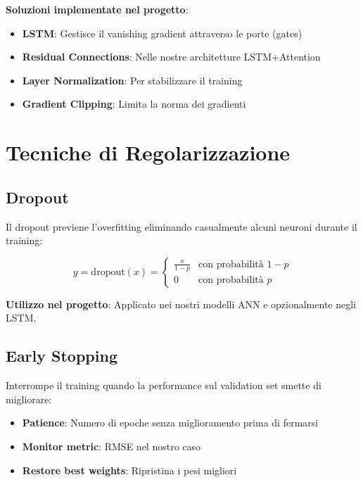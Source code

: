 \documentclass[12pt,a4paper,twoside]{report}
\begin{document}
\textbf{Soluzioni implementate nel progetto}:
\begin{itemize}
    \item \textbf{LSTM}: Gestisce il vanishing gradient attraverso le porte (gates)
    \item \textbf{Residual Connections}: Nelle nostre architetture LSTM+Attention
    \item \textbf{Layer Normalization}: Per stabilizzare il training
    \item \textbf{Gradient Clipping}: Limita la norma dei gradienti
\end{itemize}

\section{Tecniche di Regolarizzazione}

\subsection{Dropout}

Il dropout previene l'overfitting eliminando casualmente alcuni neuroni durante il training:

\begin{equation}
y = \text{dropout}(x) = \begin{cases}
\frac{x}{1-p} & \text{con probabilità } 1-p \\
0 & \text{con probabilità } p
\end{cases}
\end{equation}

\textbf{Utilizzo nel progetto}: Applicato nei nostri modelli ANN e opzionalmente negli LSTM.

\subsection{Early Stopping}

Interrompe il training quando la performance sul validation set smette di migliorare:

\begin{itemize}
    \item \textbf{Patience}: Numero di epoche senza miglioramento prima di fermarsi
    \item \textbf{Monitor metric}: RMSE nel nostro caso
    \item \textbf{Restore best weights}: Ripristina i pesi migliori
\end{itemize}
\end{document}
